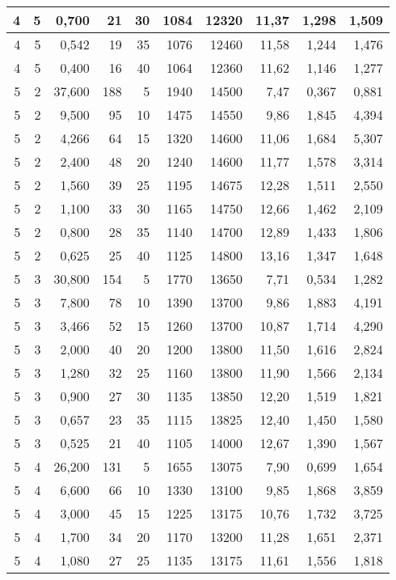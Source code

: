 \begin{tabular}{rrrrrrrrrr}
4 & 5 & 0,700 & 21 & 30 & 1084 & 12320 & 11,37 & 1,298 & 1,509 \\ \hline
4 & 5 & 0,542 & 19 & 35 & 1076 & 12460 & 11,58 & 1,244 & 1,476 \\ \hline
4 & 5 & 0,400 & 16 & 40 & 1064 & 12360 & 11,62 & 1,146 & 1,277 \\ \hline
5 & 2 & 37,600 & 188 & 5 & 1940 & 14500 & 7,47 & 0,367 & 0,881 \\ \hline
5 & 2 & 9,500 & 95 & 10 & 1475 & 14550 & 9,86 & 1,845 & 4,394 \\ \hline
5 & 2 & 4,266 & 64 & 15 & 1320 & 14600 & 11,06 & 1,684 & 5,307 \\ \hline
5 & 2 & 2,400 & 48 & 20 & 1240 & 14600 & 11,77 & 1,578 & 3,314 \\ \hline
5 & 2 & 1,560 & 39 & 25 & 1195 & 14675 & 12,28 & 1,511 & 2,550 \\ \hline
5 & 2 & 1,100 & 33 & 30 & 1165 & 14750 & 12,66 & 1,462 & 2,109 \\ \hline
5 & 2 & 0,800 & 28 & 35 & 1140 & 14700 & 12,89 & 1,433 & 1,806 \\ \hline
5 & 2 & 0,625 & 25 & 40 & 1125 & 14800 & 13,16 & 1,347 & 1,648 \\ \hline
5 & 3 & 30,800 & 154 & 5 & 1770 & 13650 & 7,71 & 0,534 & 1,282 \\ \hline
5 & 3 & 7,800 & 78 & 10 & 1390 & 13700 & 9,86 & 1,883 & 4,191 \\ \hline
5 & 3 & 3,466 & 52 & 15 & 1260 & 13700 & 10,87 & 1,714 & 4,290 \\ \hline
5 & 3 & 2,000 & 40 & 20 & 1200 & 13800 & 11,50 & 1,616 & 2,824 \\ \hline
5 & 3 & 1,280 & 32 & 25 & 1160 & 13800 & 11,90 & 1,566 & 2,134 \\ \hline
5 & 3 & 0,900 & 27 & 30 & 1135 & 13850 & 12,20 & 1,519 & 1,821 \\ \hline
5 & 3 & 0,657 & 23 & 35 & 1115 & 13825 & 12,40 & 1,450 & 1,580 \\ \hline
5 & 3 & 0,525 & 21 & 40 & 1105 & 14000 & 12,67 & 1,390 & 1,567 \\ \hline
5 & 4 & 26,200 & 131 & 5 & 1655 & 13075 & 7,90 & 0,699 & 1,654 \\ \hline
5 & 4 & 6,600 & 66 & 10 & 1330 & 13100 & 9,85 & 1,868 & 3,859 \\ \hline
5 & 4 & 3,000 & 45 & 15 & 1225 & 13175 & 10,76 & 1,732 & 3,725 \\ \hline
5 & 4 & 1,700 & 34 & 20 & 1170 & 13200 & 11,28 & 1,651 & 2,371 \\ \hline
5 & 4 & 1,080 & 27 & 25 & 1135 & 13175 & 11,61 & 1,556 & 1,818 \\ \hline

\end{tabular}
